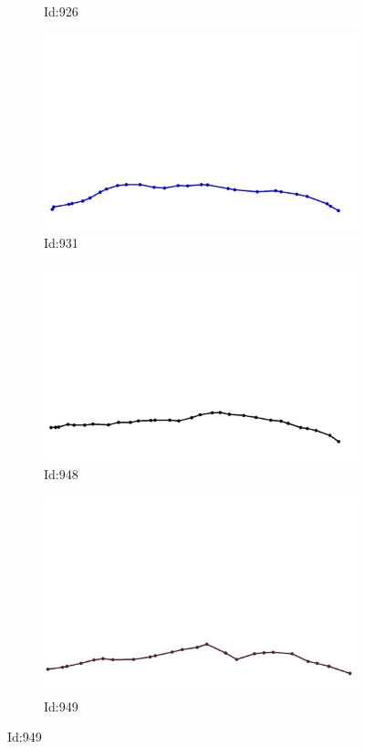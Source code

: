 \documentclass[12pt,twoside]{report}
\begin{document}
\begin{figure}
\begin{subfigure}[b]{0.20\textwidth}
\caption{Id:926}
\end{subfigure}
\begin{subfigure}[b]{0.20\textwidth}
\centering
\includegraphics[width=\textwidth]{../../trajectories/931.png}
\caption{Id:931}
\end{subfigure}
\begin{subfigure}[b]{0.20\textwidth}
\centering
\includegraphics[width=\textwidth]{../../trajectories/948.png}
\caption{Id:948}
\end{subfigure}
\begin{subfigure}[b]{0.20\textwidth}
\centering
\includegraphics[width=\textwidth]{../../trajectories/949.png}
\caption{Id:949}
\end{subfigure}
\end{figure}
\end{document}
